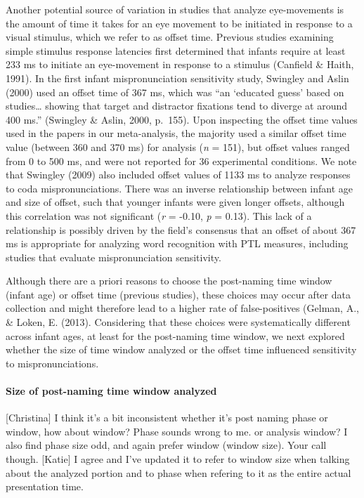 \documentclass[man]{apa6}
\let\oldparagraph\paragraph
\renewcommand{\paragraph}[1]{\oldparagraph{#1}\mbox{}}
\theoremstyle{definition}
\theoremstyle{definition}
\theoremstyle{definition}
\theoremstyle{remark}
\begin{document}
Another potential source of variation in studies that analyze
eye-movements is the amount of time it takes for an eye movement to be
initiated in response to a visual stimulus, which we refer to as offset
time. Previous studies examining simple stimulus response latencies
first determined that infants require at least 233 ms to initiate an
eye-movement in response to a stimulus (Canfield \& Haith, 1991). In the
first infant mispronunciation sensitivity study, Swingley and Aslin
(2000) used an offset time of 367 ms, which was \enquote{an
\enquote{educated guess} based on studies\ldots{} showing that target
and distractor fixations tend to diverge at around 400 ms.} (Swingley \&
Aslin, 2000, p.~155). Upon inspecting the offset time values used in the
papers in our meta-analysis, the majority used a similar offset time
value (between 360 and 370 ms) for analysis (\emph{n} = 151), but offset
values ranged from 0 to 500 ms, and were not reported for 36
experimental conditions. We note that Swingley (2009) also included
offset values of 1133 ms to analyze responses to coda mispronunciations.
There was an inverse relationship between infant age and size of offset,
such that younger infants were given longer offsets, although this
correlation was not significant (\emph{r} = -0.10, \emph{p} = 0.13).
This lack of a relationship is possibly driven by the field's consensus
that an offset of about 367 ms is appropriate for analyzing word
recognition with PTL measures, including studies that evaluate
mispronunciation sensitivity.

Although there are a priori reasons to choose the post-naming time
window (infant age) or offset time (previous studies), these choices may
occur after data collection and might therefore lead to a higher rate of
false-positives (Gelman, A., \& Loken, E. (2013). Considering that these
choices were systematically different across infant ages, at least for
the post-naming time window, we next explored whether the size of time
window analyzed or the offset time influenced sensitivity to
mispronunciations.

\paragraph{Size of post-naming time window
analyzed}\label{size-of-post-naming-time-window-analyzed}

{[}Christina{]} I think it's a bit inconsistent whether it's post naming
phase or window, how about window? Phase sounds wrong to me. or analysis
window? I also find phase size odd, and again prefer window (window
size). Your call though. {[}Katie{]} I agree and I've updated it to
refer to window size when talking about the analyzed portion and to
phase when refering to it as the entire actual presentation time.
\end{document}
